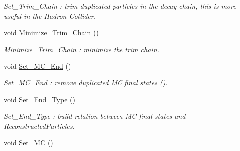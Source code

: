 \begin{DoxyCompactItemize}
\begin{DoxyCompactList}\small\item\em Set\_\-Trim\_\-Chain : trim duplicated particles in the decay chain, this is more useful in the Hadron Collider. \item\end{DoxyCompactList}\item 
\hypertarget{classToolSet_1_1CChain__Single_add44d6c51ec0df9947f1ccd4688b4fa9}{
void \hyperlink{classToolSet_1_1CChain__Single_add44d6c51ec0df9947f1ccd4688b4fa9}{Minimize\_\-Trim\_\-Chain} ()}
\label{classToolSet_1_1CChain__Single_add44d6c51ec0df9947f1ccd4688b4fa9}

\begin{DoxyCompactList}\small\item\em Minimize\_\-Trim\_\-Chain : minimize the trim chain. \item\end{DoxyCompactList}\item 
\hypertarget{classToolSet_1_1CChain__Single_a36ebac02418fd7bca0386d8b7c589533}{
void \hyperlink{classToolSet_1_1CChain__Single_a36ebac02418fd7bca0386d8b7c589533}{Set\_\-MC\_\-End} ()}
\label{classToolSet_1_1CChain__Single_a36ebac02418fd7bca0386d8b7c589533}

\begin{DoxyCompactList}\small\item\em Set\_\-MC\_\-End : remove duplicated MC final states (). \item\end{DoxyCompactList}\item 
\hypertarget{classToolSet_1_1CChain__Single_a2c537f2ce11c54ec4483efc11e3205f8}{
void \hyperlink{classToolSet_1_1CChain__Single_a2c537f2ce11c54ec4483efc11e3205f8}{Set\_\-End\_\-Type} ()}
\label{classToolSet_1_1CChain__Single_a2c537f2ce11c54ec4483efc11e3205f8}

\begin{DoxyCompactList}\small\item\em Set\_\-End\_\-Type : build relation between MC final states and ReconstructedParticles. \item\end{DoxyCompactList}\item 
\hypertarget{classToolSet_1_1CChain__Single_a98703d8507bb31e619bca8436920c8a8}{
void \hyperlink{classToolSet_1_1CChain__Single_a98703d8507bb31e619bca8436920c8a8}{Set\_\-MC} ()}
\label{classToolSet_1_1CChain__Single_a98703d8507bb31e619bca8436920c8a8}


\end{DoxyCompactItemize}
